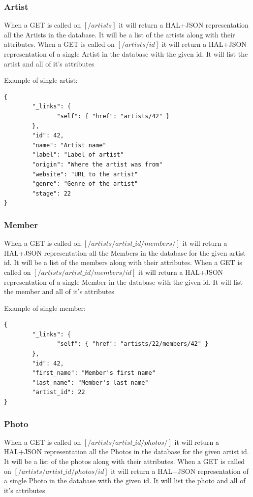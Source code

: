 \documentclass[12pt,english]{scrartcl}
\begin{document}
\subsubsection{Artist}
When a GET is called on $[/artists]$ it will return a HAL+JSON representation all the Artists in the database.  It will be a list of the artists along with their attributes.
When a GET is called on $[/artists/{id}]$ it will return a HAL+JSON representation of a single Artist in the database with the given id.  It will list the artist and all of it's attributes

Example of single artist:
\begin{verbatim}
{
        "_links": {
               "self": { "href": "artists/42" }
        },
        "id": 42,
        "name": "Artist name"
        "label": "Label of artist"
        "origin": "Where the artist was from"
        "website": "URL to the artist"
        "genre": "Genre of the artist"
        "stage": 22
}
\end{verbatim}
\subsubsection{Member}
When a GET is called on $[/artists/{artist\_id}/members/]$ it will return a HAL+JSON representation all the Members in the database for the given artist id.  It will be a list of the members along with their attributes.
When a GET is called on $[/artists/{artist\_id}/members/{id}]$ it will return a HAL+JSON representation of a single Member in the database with the given id.  It will list the member and all of it's attributes

Example of single member:
\begin{verbatim}
{
        "_links": {
               "self": { "href": "artists/22/members/42" }
        },
        "id": 42,
        "first_name": "Member's first name"
        "last_name": "Member's last name"
        "artist_id": 22
}
\end{verbatim}
\subsubsection{Photo}
When a GET is called on $[/artists/{artist\_id}/photos/]$ it will return a HAL+JSON representation all the Photos in the database for the given artist id.  It will be a list of the photos along with their attributes.
When a GET is called on $[/artists/{artist\_id}/photos/{id}]$ it will return a HAL+JSON representation of a single Photo in the database with the given id.  It will list the photo and all of it's attributes
\end{document}
